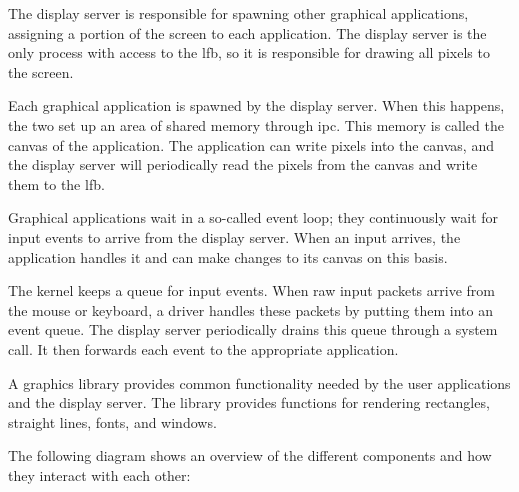 \documentclass{report}
\begin{document}
The display server is responsible for spawning other graphical applications,
assigning a portion of the screen to each application. The display server is
the only process with access to the \gls{lfb}, so it is responsible for
drawing all pixels to the screen. 

Each graphical application is spawned by the display server. When this
happens, the two set up an area of shared memory through \gls{ipc}. This
memory is called the canvas of the application. The application can write
pixels into the canvas, and the display server will periodically read the
pixels from the canvas and write them to the \gls{lfb}.

Graphical applications wait in a so-called event loop; they continuously wait
for input events to arrive from the display server. When an input arrives, the
application handles it and can make changes to its canvas on this basis.

The kernel keeps a queue for input events. When raw input packets arrive from
the mouse or keyboard, a driver handles these packets by putting them into an
event queue. The display server periodically drains this queue through a
system call. It then forwards each event to the appropriate application.

A graphics library provides common functionality needed by the user
applications and the display server. The library provides functions for
rendering rectangles, straight lines, fonts, and windows.

The following diagram shows an overview of the different components and how
they interact with each other:
\end{document}
